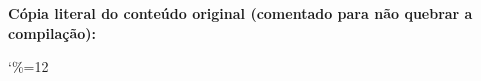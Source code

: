 \documentclass[11pt,a4paper]{article}
\theoremstyle{mystyle}
\newtheorem{lemma}{Lema}
\theoremstyle{defstyle}
\begin{document}
\noindent\textbf{Cópia literal do conteúdo original (comentado para não quebrar a compilação):}
\begin{flushleft}
\begin{minipage}{\textwidth}
\begingroup
\makeatletter
\catcode`\%=12
% 
% 
% 
% 
% 
% 
% 
% 
% 

\end{minipage}
\end{flushleft}
\end{document}
